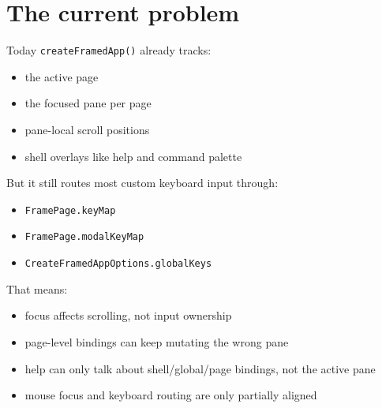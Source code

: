 \section{The current problem}\label{record-044-the-current-problem}

Today \texttt{c\allowbreak{}r\allowbreak{}e\allowbreak{}a\allowbreak{}t\allowbreak{}e\allowbreak{}F\allowbreak{}r\allowbreak{}a\allowbreak{}m\allowbreak{}e\allowbreak{}d\allowbreak{}A\allowbreak{}p\allowbreak{}p\allowbreak{}(\allowbreak{})} already tracks:

\begin{itemize}
\tightlist
\item
  the active page
\item
  the focused pane per page
\item
  pane-local scroll positions
\item
  shell overlays like help and command palette
\end{itemize}

But it still routes most custom keyboard input through:

\begin{itemize}
\tightlist
\item
  \texttt{F\allowbreak{}r\allowbreak{}a\allowbreak{}m\allowbreak{}e\allowbreak{}P\allowbreak{}a\allowbreak{}g\allowbreak{}e\allowbreak{}.\allowbreak{}k\allowbreak{}e\allowbreak{}y\allowbreak{}M\allowbreak{}a\allowbreak{}p}
\item
  \texttt{F\allowbreak{}r\allowbreak{}a\allowbreak{}m\allowbreak{}e\allowbreak{}P\allowbreak{}a\allowbreak{}g\allowbreak{}e\allowbreak{}.\allowbreak{}m\allowbreak{}o\allowbreak{}d\allowbreak{}a\allowbreak{}l\allowbreak{}K\allowbreak{}e\allowbreak{}y\allowbreak{}M\allowbreak{}a\allowbreak{}p}
\item
  \texttt{C\allowbreak{}r\allowbreak{}e\allowbreak{}a\allowbreak{}t\allowbreak{}e\allowbreak{}F\allowbreak{}r\allowbreak{}a\allowbreak{}m\allowbreak{}e\allowbreak{}d\allowbreak{}A\allowbreak{}p\allowbreak{}p\allowbreak{}O\allowbreak{}p\allowbreak{}t\allowbreak{}i\allowbreak{}o\allowbreak{}n\allowbreak{}s\allowbreak{}.\allowbreak{}g\allowbreak{}l\allowbreak{}o\allowbreak{}b\allowbreak{}a\allowbreak{}l\allowbreak{}K\allowbreak{}e\allowbreak{}y\allowbreak{}s}
\end{itemize}

That means:

\begin{itemize}
\tightlist
\item
  focus affects scrolling, not input ownership
\item
  page-level bindings can keep mutating the wrong pane
\item
  help can only talk about shell/global/page bindings, not the active pane
\item
  mouse focus and keyboard routing are only partially aligned
\end{itemize}


